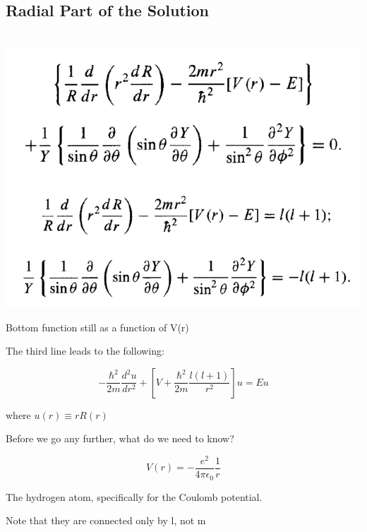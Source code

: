 \documentclass{article}
\begin{document}
\subsection{Radial Part of the Solution}

\
\includegraphics[width = 0.6 \textwidth]{Lecture20/3.png}

Bottom function still as a function of V(r)


The third line leads to the following:

$$- \frac{\hbar^2}{2m} \frac{d^2 u}{dr^2} + \left[ V + \frac{\hbar^2}{2m} \frac{l(l+1)}{r^2} \right] u = Eu$$

where $u(r) \equiv r R(r)$

Before we go any further, what do we need to know?

$$V(r) = - \frac{e^2}{4 \pi \epsilon_0} \frac{1}{r}$$

The hydrogen atom, specifically for the Coulomb potential.  

\break 

Note that they are connected only by l, not m
\end{document}
